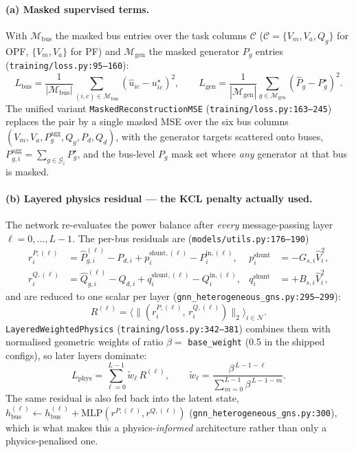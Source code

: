 \documentclass[11pt]{article}
\newcommand{\pred}[1]{\widehat{#1}}
\newcommand{\code}[1]{\texttt{\small #1}}
\begin{document}
\paragraph{(a) Masked supervised terms.}
With $\mathcal{M}_{\mathrm{bus}}$ the masked bus entries over the task columns
$\mathcal{C}$ ($\mathcal{C}=\{V_m,V_a,Q_g\}$ for OPF, $\{V_m,V_a\}$ for PF) and
$\mathcal{M}_{\mathrm{gen}}$ the masked generator $P_g$ entries
(\code{training/loss.py:95--160}):
\begin{equation}
L_{\mathrm{bus}}=\frac{1}{|\mathcal{M}_{\mathrm{bus}}|}\!\!\sum_{(i,c)\in\mathcal{M}_{\mathrm{bus}}}\!\!\left(\pred{u}_{ic}-u^\star_{ic}\right)^2,
\qquad
L_{\mathrm{gen}}=\frac{1}{|\mathcal{M}_{\mathrm{gen}}|}\!\!\sum_{g\in\mathcal{M}_{\mathrm{gen}}}\!\!\left(\pred{P}_g-P^\star_g\right)^2 .
\label{eq:gridfm-masked}
\end{equation}
The unified variant \code{MaskedReconstructionMSE} (\code{training/loss.py:163--245})
replaces the pair by a single masked MSE over the six bus columns
$(V_m,V_a,P_g^{\mathrm{agg}},Q_g,P_d,Q_d)$, with the generator targets scattered onto buses,
$P_{g,i}^{\mathrm{agg}}=\sum_{g\in\mathcal{G}_i}P_g^\star$, and the bus-level $P_g$ mask set
where \emph{any} generator at that bus is masked.

\paragraph{(b) Layered physics residual --- the KCL penalty actually used.}
The network re-evaluates the power balance after \emph{every} message-passing layer
$\ell=0,\dots,L-1$. The per-bus residuals are (\code{models/utils.py:176--190})
\begin{align}
r^{P,(\ell)}_i &= \pred{P}^{(\ell)}_{g,i}-P_{d,i}+p^{\mathrm{shunt},(\ell)}_i-P^{\mathrm{in},(\ell)}_i,
& p^{\mathrm{shunt}}_i&=-G_{s,i}\pred{V}_i^2,
\label{eq:gridfm-rp}\\
r^{Q,(\ell)}_i &= \pred{Q}^{(\ell)}_{g,i}-Q_{d,i}+q^{\mathrm{shunt},(\ell)}_i-Q^{\mathrm{in},(\ell)}_i,
& q^{\mathrm{shunt}}_i&=+B_{s,i}\pred{V}_i^2,
\label{eq:gridfm-rq}
\end{align}
and are reduced to one scalar per layer (\code{gnn\_heterogeneous\_gns.py:295--299}):
\begin{equation}
R^{(\ell)}=\Big\langle \big\|(r^{P,(\ell)}_i,\,r^{Q,(\ell)}_i)\big\|_2 \Big\rangle_{i\in\mathcal{N}} .
\label{eq:gridfm-Rl}
\end{equation}
\code{LayeredWeightedPhysics} (\code{training/loss.py:342--381}) combines them with
normalised geometric weights of ratio $\beta=$ \code{base\_weight} (0.5 in the shipped
configs), so later layers dominate:
\begin{equation}
\boxed{\;
L_{\mathrm{phys}}=\sum_{\ell=0}^{L-1} \tilde w_\ell\, R^{(\ell)},
\qquad
\tilde w_\ell=\frac{\beta^{\,L-1-\ell}}{\sum_{m=0}^{L-1}\beta^{\,L-1-m}} .
\;}
\label{eq:gridfm-layered}
\end{equation}
The same residual is also fed back into the latent state,
$h^{(\ell)}_{\mathrm{bus}}\!\leftarrow\! h^{(\ell)}_{\mathrm{bus}}+\mathrm{MLP}(r^{P,(\ell)},r^{Q,(\ell)})$
(\code{gnn\_heterogeneous\_gns.py:300}), which is what makes this a physics-\emph{informed}
architecture rather than only a physics-penalised one.
\end{document}
